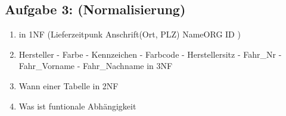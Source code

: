 \subsection{Aufgabe 3: (Normalisierung)}
\label{sec:Aufgabe3}
\begin{enumerate}[label=\alph*)]
    \item in 1NF (Lieferzeitpunk Anschrift(Ort, PLZ) NameORG ID )
    \item Hersteller - Farbe - Kennzeichen - Farbcode - Herstellersitz - Fahr\_Nr - Fahr\_Vorname - Fahr\_Nachname in 3NF 
    \item Wann einer Tabelle in 2NF
    \item Was ist funtionale Abhängigkeit
\end{enumerate}